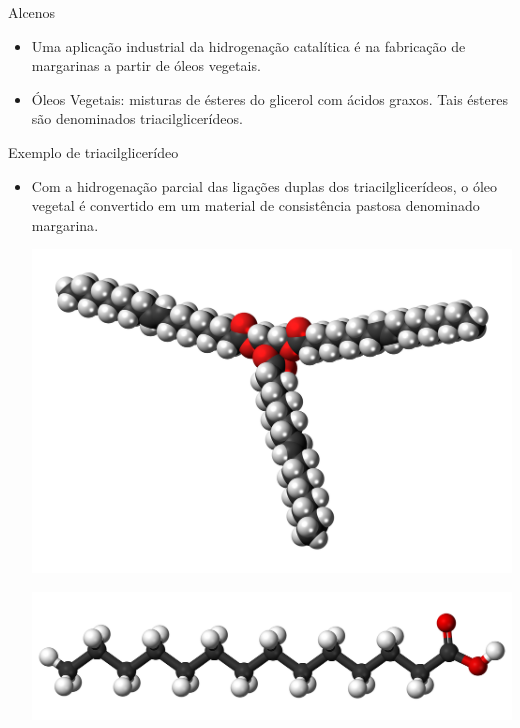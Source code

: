 \documentclass{beamer}
\begin{document}
\begin{frame}[label={sec:orgd3ecc3c}]{Alcenos}
\begin{block}{}
\begin{itemize}
\item Uma aplicação industrial da hidrogenação catalítica é na fabricação de margarinas a partir de óleos vegetais.
\item Óleos Vegetais: misturas de ésteres do glicerol com ácidos graxos. Tais ésteres são denominados \alert{triacilglicerídeos}.
\end{itemize}


\begin{bclogo}[couleur=blue!30 , arrondi=0.1 , logo=\bcplume , epBarre=3.5]{Exemplo de triacilglicerídeo}
\end{bclogo}
\end{block}


\begin{block}{}
\begin{itemize}
\item Com a hidrogenação parcial das ligações duplas dos triacilglicerídeos, o óleo vegetal é convertido em um material de consistência pastosa denominado \alert{margarina}.

\begin{center}
\includegraphics[scale=0.05]{../ReacoesOrganicas/trigli3D.png}
\end{center} \par
\begin{center}
\includegraphics[scale=0.05]{../ReacoesOrganicas/triglimono.png}
\end{center}
\end{itemize}
\end{block}




\end{frame}
\end{document}
